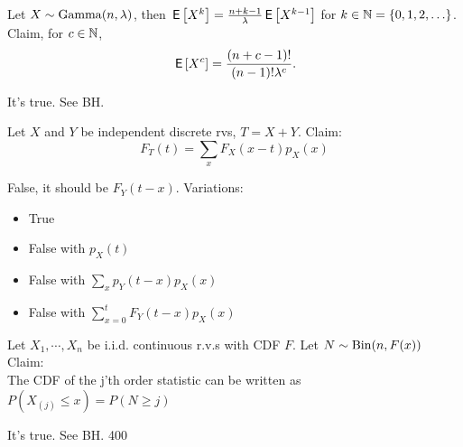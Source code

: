 \documentclass[tf-tutorial-all.tex]{subfiles}
\begin{document}
\begin{truefalse}
Let $X \sim \mathrm{Gamma}(n,\lambda)$, then $\,\mathsf{E}\left[X^{k}\right] = \frac{n+k-1}{\lambda} \,\mathsf{E}\left[X^{k-1}\right]$ for $k \in \mathbb{N} = \{0, 1, 2, \ldots\}$.
Claim, for $c\in \mathbb{N}$,
\begin{equation}
\,\mathsf{E}\left[X^{c}\right] =  \frac{(n+c-1)!}{(n-1)!\lambda^{c}}.
\end{equation}
    \begin{solution}
    It's true. See BH.
    \end{solution}
\end{truefalse}

\begin{truefalse}
  Let $X$ and $Y$ be independent discrete rvs, $T = X + Y$. Claim:
  $$F_T(t) = \sum_x F_X(x - t) p_X(x)$$
\begin{solution}
  False, it should be $F_Y(t - x)$.
  Variations:
  \begin{itemize}
  \item True
  \item False with $p_X(t)$
  \item False with $\sum_x p_Y(t -  x) p_X(x)$
  \item False with $\sum_{x=0}^t F_Y(t - x) p_X(x)$
  \end{itemize}
\end{solution}
\end{truefalse}

\begin{truefalse}
Let $X_1, \cdots, X_n$ be i.i.d. continuous r.v.s with CDF $F$. Let $N\sim \mathrm{Bin}(n,F(x))$ Claim:\\
The CDF of the j'th order statistic can be written as $P(X_{(j)} \leq x) = P(N \geq j)$
\begin{solution}
It's true. See BH. 400
\end{solution}
\end{truefalse}
\end{document}
